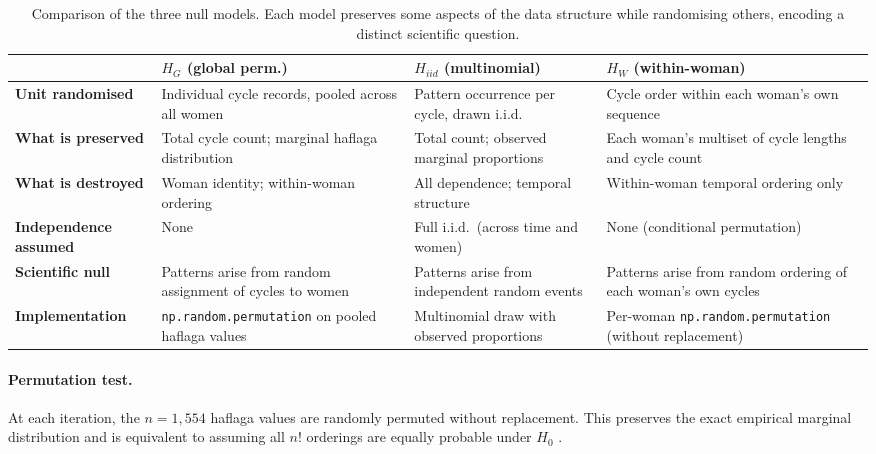 \documentclass[12pt]{article}
\begin{document}
\begin{table}[H]
\centering
\caption{Comparison of the three null models. Each model preserves some aspects of the data
  structure while randomising others, encoding a distinct scientific question.}
\label{tab:nullmodels}
\small
\begin{tabular}{L{3.2cm} L{3.6cm} L{3.6cm} L{3.6cm}}
\toprule
& \textbf{$H_G$} (global perm.) & \textbf{$H_{iid}$} (multinomial) & \textbf{$H_W$} (within-woman) \\
\midrule
\textbf{Unit randomised} &
  Individual cycle records, pooled across all women &
  Pattern occurrence per cycle, drawn i.i.d.\ &
  Cycle order within each woman's own sequence \\[4pt]
\textbf{What is preserved} &
  Total cycle count; marginal haflaga distribution &
  Total count; observed marginal proportions &
  Each woman's multiset of cycle lengths and cycle count \\[4pt]
\textbf{What is destroyed} &
  Woman identity; within-woman ordering &
  All dependence; temporal structure &
  Within-woman temporal ordering only \\[4pt]
\textbf{Independence assumed} &
  None &
  Full i.i.d.\ (across time and women) &
  None (conditional permutation) \\[4pt]
\textbf{Scientific null} &
  Patterns arise from random assignment of cycles to women &
  Patterns arise from independent random events &
  Patterns arise from random ordering of each woman's own cycles \\[4pt]
\textbf{Implementation} &
  \texttt{np.random.permutation} on pooled haflaga values &
  Multinomial draw with observed proportions &
  Per-woman \texttt{np.random.permutation} (without replacement) \\
\bottomrule
\end{tabular}
\end{table}

\paragraph{Permutation test.}
At each iteration, the $n = 1{,}554$ haflaga values are randomly permuted without
replacement. This preserves the exact empirical marginal distribution and is
equivalent to assuming all $n!$ orderings are equally probable under $H_0$
\cite{edgington2007}.
\end{document}
